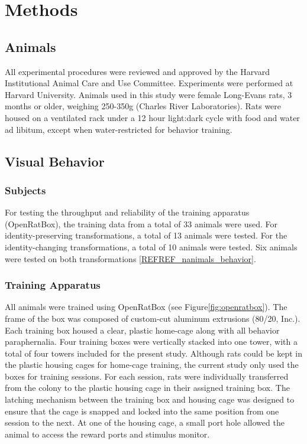 \chapter{Methods}
\label{methods}

\section{Animals}
All experimental procedures were reviewed and approved by the Harvard Institutional Animal Care and Use Committee. Experiments were performed at Harvard University. Animals used in this study were female Long-Evans rats, 3 months or older, weighing 250-350g (Charles River Laboratories). Rats were housed on a ventilated rack under a 12 hour light:dark cycle with food and water ad libitum, except when water-restricted for behavior training. 

\section{Visual Behavior}
\subsection{Subjects}
For testing the throughput and reliability of the training apparatus (OpenRatBox), the training data from a total of 33 animals were used. For identity-preserving transformations, a total of 13 animals were tested. For the identity-changing transformations, a total of 10 animals were tested. Six animals were tested on both transformations \ref{REFREF_nanimals_behavior}.

\subsection{Training Apparatus}
All animals were trained using OpenRatBox (see Figure\ref{fig:openratbox}). The frame of the box was composed of custom-cut aluminum extrusions (80/20, Inc.). Each training box housed a clear, plastic home-cage along with all behavior paraphernalia. Four training boxes were vertically stacked into one tower, with a total of four towers included for the present study. Although rats could be kept in the plastic housing cages for home-cage training, the current study only used the boxes for training sessions. For each session, rats were individually transferred from the colony to the plastic housing cage in their assigned training box. The latching mechanism between the training box and housing cage was designed to ensure that the cage is snapped and locked into the same position from one session to the next. At one of the housing cage, a small port hole allowed the animal to access the reward ports and stimulus monitor. 

